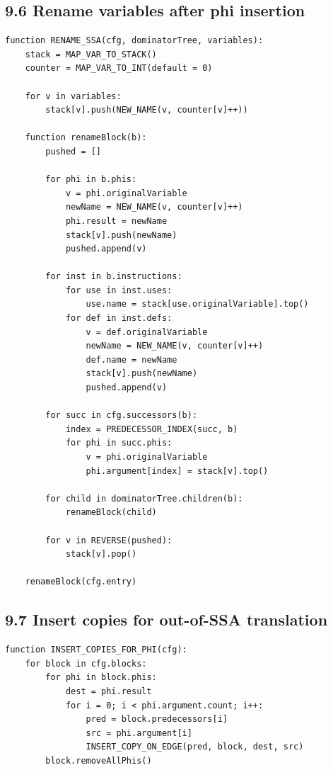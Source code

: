\documentclass[10pt,letterpaper]{article}
\begin{document}
\subsection*{9.6 Rename variables after phi insertion}

\begin{verbatim}
function RENAME_SSA(cfg, dominatorTree, variables):
    stack = MAP_VAR_TO_STACK()
    counter = MAP_VAR_TO_INT(default = 0)

    for v in variables:
        stack[v].push(NEW_NAME(v, counter[v]++))

    function renameBlock(b):
        pushed = []

        for phi in b.phis:
            v = phi.originalVariable
            newName = NEW_NAME(v, counter[v]++)
            phi.result = newName
            stack[v].push(newName)
            pushed.append(v)

        for inst in b.instructions:
            for use in inst.uses:
                use.name = stack[use.originalVariable].top()
            for def in inst.defs:
                v = def.originalVariable
                newName = NEW_NAME(v, counter[v]++)
                def.name = newName
                stack[v].push(newName)
                pushed.append(v)

        for succ in cfg.successors(b):
            index = PREDECESSOR_INDEX(succ, b)
            for phi in succ.phis:
                v = phi.originalVariable
                phi.argument[index] = stack[v].top()

        for child in dominatorTree.children(b):
            renameBlock(child)

        for v in REVERSE(pushed):
            stack[v].pop()

    renameBlock(cfg.entry)
\end{verbatim}

\subsection*{9.7 Insert copies for out-of-SSA translation}

\begin{verbatim}
function INSERT_COPIES_FOR_PHI(cfg):
    for block in cfg.blocks:
        for phi in block.phis:
            dest = phi.result
            for i = 0; i < phi.argument.count; i++:
                pred = block.predecessors[i]
                src = phi.argument[i]
                INSERT_COPY_ON_EDGE(pred, block, dest, src)
        block.removeAllPhis()
\end{verbatim}
\end{document}

